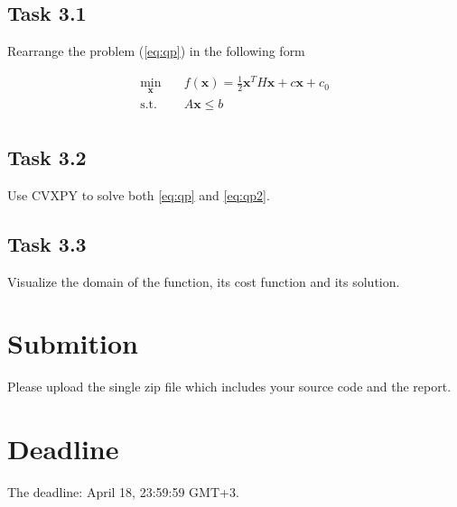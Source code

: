 \documentclass[12pt]{article}%
\begin{document}
\subsection{Task 3.1}

Rearrange the problem (\ref{eq:qp}) in the following form 

\begin{equation}\label{eq:qp2}
\begin{aligned}
 \min_{\mathbf{x}} \quad &   f(\mathbf{x}) = \frac{1}{2}\mathbf{x}^T H  \mathbf{x} + c \mathbf{x} + c_0 \\
\textrm{s.t.} \quad  & A \mathbf{x} \leq b \\
\end{aligned}
\end{equation}

\subsection{Task 3.2}

Use CVXPY to solve both \eqref{eq:qp} and \eqref{eq:qp2}. 

\subsection{Task 3.3}

Visualize the domain of the function, its cost function and its solution.

\section{Submition}

Please upload the single zip file which includes your source code and the report. 

\section{Deadline}
The deadline: April 18, 23:59:59 GMT+3.
\end{document}
